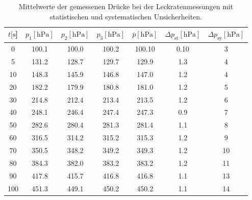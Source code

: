 %
\begin{table}[H]
  \centering
    \caption{Mittelwerte der gemessenen Drücke bei der Leckratenmessungen mit statistischen und systematischen Unsicherheiten.}
    \label{tab:Dreh_Leck4}
    \begin{tabular}{
      S[table-format=3.0] 
      S[table-format=3.1] S[table-format=3.1] S[table-format=3.1]
      S[table-format=3.2] S[table-format=1.2] S[table-format=2.0]
      }
      \toprule
      {$t [\si{\second}$]} &
      {$p_1 [\si{\hecto\pascal}]$} & {$p_2 [\si{\hecto\pascal}]$} & {$p_3 [\si{\hecto\pascal}]$} &
      {$\bar{p} [\si{\hecto\pascal}]$} & {$\Delta p_\text{st} [\si{\hecto\pascal}]$} & {$\Delta p_\text{sy} [\si{\hecto\pascal}]$}\\
         & 100.1 & 100.0 & 100.2 & 100.10 & 0.10 & 3\\
      5   & 131.2 & 128.7 & 129.7 & 129.9  & 1.3 & 4 \\
      10  & 148.3 & 145.9 & 146.8 & 147.0  & 1.2 & 4 \\
      20  & 182.2 & 179.9 & 180.8 & 181.0  & 1.2 & 5 \\
      30  & 214.8 & 212.4 & 213.4 & 213.5  & 1.2 & 6 \\
      40  & 248.1 & 246.4 & 247.4 & 247.3  & 0.9 & 7 \\
      50  & 282.6 & 280.4 & 281.3 & 281.4  & 1.1 & 8 \\
      60  & 316.5 & 314.2 & 315.2 & 315.3  & 1.2 & 9 \\
      70  & 350.5 & 348.2 & 349.2 & 349.3  & 1.2 & 10\\
      80  & 384.3 & 382.0 & 383.2 & 383.2  & 1.2 & 11\\
      90  & 417.8 & 415.7 & 416.8 & 416.8  & 1.1 & 13\\
      100 & 451.3 & 449.1 & 450.2 & 450.2  & 1.1 & 14\\
      \bottomrule
    \end{tabular}
\end{table}
\noindent
